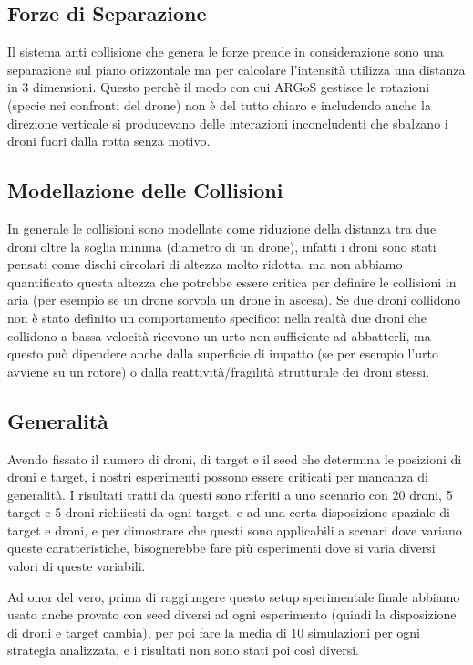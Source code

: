 \documentclass[a4paper,11pt,oneside, table]{article}
\begin{document}
\subsection{Forze di Separazione}

Il sistema anti collisione che genera le forze prende in considerazione sono una separazione sul piano orizzontale ma per calcolare l'intensit\`a utilizza una distanza in 3 dimensioni.
Questo perch\`e il modo con cui ARGoS gestisce le rotazioni (specie nei confronti del drone) non \`e del tutto chiaro e includendo anche la direzione verticale si producevano delle interazioni inconcludenti che sbalzano i droni fuori dalla rotta senza motivo.

\subsection{Modellazione delle Collisioni}

In generale le collisioni sono modellate come riduzione della distanza tra due droni oltre la soglia minima (diametro di un drone), infatti i droni sono stati pensati come dischi circolari di altezza molto ridotta, ma non abbiamo quantificato questa altezza che potrebbe essere critica per definire le collisioni in aria (per esempio se un drone sorvola un drone in ascesa).
Se due droni collidono non \`e stato definito un comportamento specifico: nella realt\`a due droni che collidono a bassa velocit\`a ricevono un urto non sufficiente ad abbatterli, ma questo pu\`o dipendere anche dalla superficie di impatto (se per esempio l'urto avviene su un rotore) o dalla reattivit\`a/fragilit\`a strutturale dei droni stessi.


\subsection{Generalit\`a}
Avendo fissato il numero di droni, di target e il seed che determina le posizioni di droni e target, i nostri esperimenti possono essere criticati per mancanza di generalità. I risultati tratti da questi sono riferiti a uno scenario con 20 droni, 5 target e 5 droni richiiesti da ogni target, e ad una certa disposizione spaziale di target e droni, e per dimostrare che questi sono applicabili a scenari dove variano queste caratteristiche, bisognerebbe fare più esperimenti dove si varia diversi valori di queste variabili.

Ad onor del vero, prima di raggiungere questo setup sperimentale finale abbiamo usato anche provato con seed diversi ad ogni esperimento (quindi la disposizione di droni e target cambia), per poi fare la media di 10 simulazioni per ogni strategia analizzata, e i risultati non sono stati poi così diversi.
\end{document}
